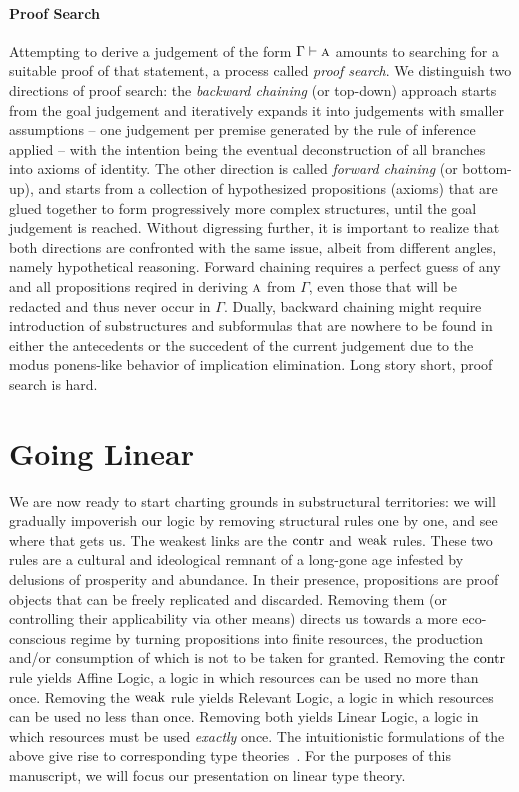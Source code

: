 \paragraph{Proof Search}
Attempting to derive a judgement of the form $\Gamma \vdash \normalfont\textsc{a}$ amounts to searching for a suitable proof of that statement, a process called \textit{proof search}.
We distinguish two directions of proof search: the \textit{backward chaining} (or top-down) approach starts from the goal judgement and iteratively expands it into judgements with smaller assumptions -- one judgement per premise generated by the rule of inference applied -- with the intention being the eventual deconstruction of all branches into axioms of identity.
The other direction is called \textit{forward chaining} (or bottom-up), and starts from a collection of hypothesized propositions (axioms) that are glued together to form progressively more complex structures, until the goal judgement is reached.
Without digressing further, it is important to realize that both directions are confronted with the same issue, albeit from different angles, namely hypothetical reasoning.
Forward chaining requires a perfect guess of any and all propositions reqired in deriving $\normalfont\textsc{a}$ from $\Gamma$, even those that will be redacted and thus never occur in $\Gamma$.
Dually, backward chaining might require introduction of substructures and subformulas that are nowhere to be found in either the antecedents or the succedent of the current judgement due to the modus ponens-like behavior of implication elimination.
Long story short, proof search is hard.

\section{Going Linear}\label{section:linear_type_theory}
We are now ready to start charting grounds in substructural territories: we will gradually impoverish our logic by removing structural rules one by one, and see where that gets us. 
The weakest links are the $\mathrm{contr}{}$ and $\mathrm{weak}{}$ rules.
These two rules are a cultural and ideological remnant of a long-gone age infested by delusions of prosperity and abundance.
In their presence, propositions are proof objects that can be freely replicated and discarded.
Removing them (or controlling their applicability via other means) directs us towards a more eco-conscious regime by turning propositions into finite resources, the production and/or consumption of which is not to be taken for granted.
Removing the $\mathrm{contr}{}$ rule yields Affine Logic, a logic in which resources can be used no more than once.
Removing the $\mathrm{weak}{}$ rule yields Relevant Logic, a logic in which resources can be used no less than once.
Removing both yields Linear Logic, a logic in which resources must be used \textit{exactly} once.
The intuitionistic formulations of the above give rise to corresponding type theories~\cite{pierce2004advanced}.
For the purposes of this manuscript, we will focus our presentation on linear type theory.

